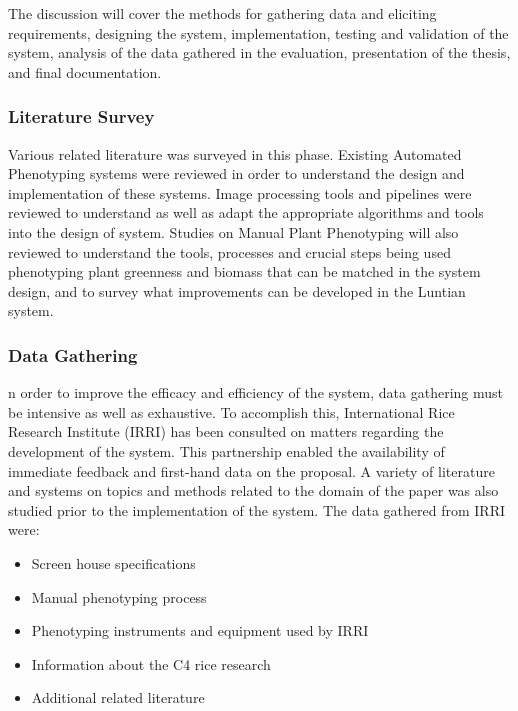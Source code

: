 	The discussion will cover the methods for gathering data and eliciting requirements, designing the system, implementation, testing and validation of the system, analysis of the data gathered in the evaluation, presentation of the thesis, and final documentation.

\subsubsection{Literature Survey}
\label{sec:literaturesurvey}

Various related literature was surveyed in this phase. Existing Automated Phenotyping systems were reviewed in order to understand the design and implementation of these systems. Image processing tools and pipelines were reviewed to understand as well as adapt the appropriate algorithms and tools into the design of system. Studies on Manual Plant Phenotyping will also reviewed to understand the tools, processes and crucial steps being used phenotyping plant greenness and biomass that can be matched in the system design, and to survey what improvements can be developed in the Luntian system. 

\subsubsection{Data Gathering}
\label{sec:datagathering}

n order to improve the efficacy and efficiency of the system, data gathering must be intensive as well as exhaustive. To accomplish this, International Rice Research Institute (IRRI) has been consulted on matters regarding the development of the system. This partnership enabled the availability of immediate feedback and first-hand data on the proposal. A variety of literature and systems on topics and methods related to the domain of the paper was also studied prior to the implementation of the system. The data gathered from IRRI were:   

\begin{itemize}
\item Screen house specifications
\item Manual phenotyping process
\item Phenotyping instruments and equipment used by IRRI
\item Information about the C4 rice research
\item Additional related literature
\end{itemize}

